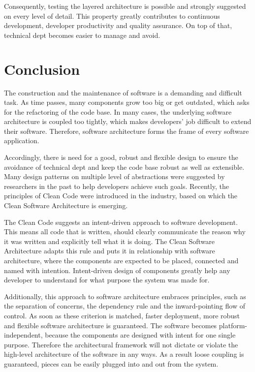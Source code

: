 \documentclass[conference]{IEEEtran}
\begin{document}
Consequently, testing the layered architecture is possible and strongly suggested on every level of detail. This property greatly contributes to continuous development, developer productivity and quality assurance. On top of that, technical dept becomes easier to manage and avoid.

\section{Conclusion}
The construction and the maintenance of software is a demanding and difficult task. As time passes, many components grow too big or get outdated, which asks for the refactoring of the code base. In many cases, the underlying software architecture is coupled too tightly, which makes developers' job difficult to extend their software. Therefore, software architecture forms the frame of every software application.

Accordingly, there is need for a good, robust and flexible design to ensure the avoidance of technical dept and keep the code base robust as well as extensible. Many design patterns on multiple level of abstractions were suggested by researchers in the past to help developers achieve such goals. Recently, the principles of Clean Code were introduced in the industry, based on which the Clean Software Architecture is emerging. 

The Clean Code suggests an intent-driven approach to software development. This means all code that is written, should clearly communicate the reason why it was written and explicitly tell what it is doing. The Clean Software Architecture adapts this rule and puts it in relationship with software architecture, where the components are expected to be placed, connected and named with intention. Intent-driven design of components greatly help any developer to understand for what purpose the system was made for. 

Additionally, this approach to software architecture embraces principles, such as the separation of concerns, the dependency rule and the inward-pointing flow of control. As soon as these criterion is matched, faster deployment, more robust and flexible software architecture is guaranteed. The software becomes platform-independent, because the components are designed with intent for one single purpose. Therefore the architectural framework will not dictate or violate the high-level architecture of the software in any ways. As a result loose coupling is guaranteed, pieces can be easily plugged into and out from the system. 
\end{document}
